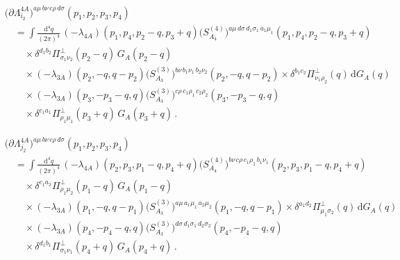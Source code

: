\documentclass[11pt,a4paper]{article}
\begin{document}
\begin{align}
&\bigl(\partial\Lambda^{4A}_{i_2}\bigr)^{a\mu\,b\nu\,c\rho\,d\sigma}(p_1,p_2,p_3,p_4)
\nonumber\\
&\quad=
\int\frac{\mathrm{d}^4q}{(2\pi)^4}\,
(-\lambda_{4A})(p_1,p_4,p_2-q,p_3+q)
\bigl(S^{(4)}_{A_4}\bigr)^{a\mu\,d\sigma\,d_1\sigma_1\,a_1\mu_1}(p_1,p_4,p_2-q,p_3+q)
\nonumber\\
&\qquad\times
\delta^{d_1b_2}\Pi^\perp_{\sigma_1\nu_2}(p_2-q)\,G_A(p_2-q)
\nonumber\\
&\qquad\times
(-\lambda_{3A})(p_2,-q,q-p_2)
\bigl(S^{(3)}_{A_3}\bigr)^{b\nu\,b_1\nu_1\,b_2\nu_2}(p_2,-q,q-p_2)
\times
\delta^{b_1c_2}\Pi^\perp_{\nu_1\rho_2}(q)\,\mathrm{d}G_A(q)
\nonumber\\
&\qquad\times
(-\lambda_{3A})(p_3,-p_3-q,q)
\bigl(S^{(3)}_{A_3}\bigr)^{c\rho\,c_1\rho_1\,c_2\rho_2}(p_3,-p_3-q,q)
\nonumber\\
&\qquad\times
\delta^{c_1a_1}\Pi^\perp_{\rho_1\mu_1}(p_3+q)\,G_A(p_3+q)\,.
\label{eq:dLam-i2}
\end{align}

\begin{align}
&\bigl(\partial\Lambda^{4A}_{j_2}\bigr)^{a\mu\,b\nu\,c\rho\,d\sigma}(p_1,p_2,p_3,p_4)
\nonumber\\
&\quad=
\int\frac{\mathrm{d}^4q}{(2\pi)^4}\,
(-\lambda_{4A})(p_2,p_3,p_1-q,p_4+q)
\bigl(S^{(4)}_{A_4}\bigr)^{b\nu\,c\rho\,c_1\rho_1\,b_1\nu_1}(p_2,p_3,p_1-q,p_4+q)
\nonumber\\
&\qquad\times
\delta^{c_1a_2}\Pi^\perp_{\rho_1\mu_2}(p_1-q)\,G_A(p_1-q)
\nonumber\\
&\qquad\times
(-\lambda_{3A})(p_1,-q,q-p_1)
\bigl(S^{(3)}_{A_3}\bigr)^{a\mu\,a_1\mu_1\,a_2\mu_2}(p_1,-q,q-p_1)
\times
\delta^{a_1d_2}\Pi^\perp_{\mu_1\sigma_2}(q)\,\mathrm{d}G_A(q)
\nonumber\\
&\qquad\times
(-\lambda_{3A})(p_4,-p_4-q,q)
\bigl(S^{(3)}_{A_3}\bigr)^{d\sigma\,d_1\sigma_1\,d_2\sigma_2}(p_4,-p_4-q,q)
\nonumber\\
&\qquad\times
\delta^{d_1b_1}\Pi^\perp_{\sigma_1\nu_1}(p_4+q)\,G_A(p_4+q)\,.
\label{eq:dLam-j2}
\end{align}
\end{document}
